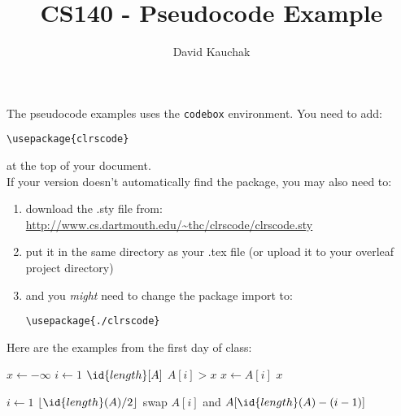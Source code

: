 \documentclass[11pt]{article}
\title{CS140 - Pseudocode Example}
\author{David Kauchak}
\date{}
\begin{document}
\maketitle


% 
%
%

The pseudocode examples uses the \texttt{codebox} environment.  You need to add:

\begin{verbatim}
\usepackage{clrscode}
\end{verbatim}

at the top of your document.\\

If your version doesn't automatically find the package, you may also need to:

\begin{enumerate}
\item download the .sty file from:
\url{http://www.cs.dartmouth.edu/~thc/clrscode/clrscode.sty}

\item put it in the same directory as your .tex file (or upload it to your overleaf project directory)

\item and you \emph{might} need to change the package import to:

\begin{verbatim}
\usepackage{./clrscode}
\end{verbatim}

\end{enumerate}

Here are the examples from the first day of class:

		\begin{codebox}
		\li $x \gets -\infty$
		\li \For $i \gets 1$ \To $\id{length}[A]$
		\li	\If $A[i] > x$
		\li		$x \gets A[i]$
			\End
		 \End
		\li \Return $x$
	       \end{codebox}

		\begin{codebox}
		\Procname{$\proc{Mystery2}(A)$}
		\li \For $i \gets 1$ \To $\lfloor\id{length}(A)/2\rfloor$
		\li 	 swap $A[i]$ and $A[\id{length}(A) - (i-1)]$
			\End
		\end{codebox}
\end{document}
